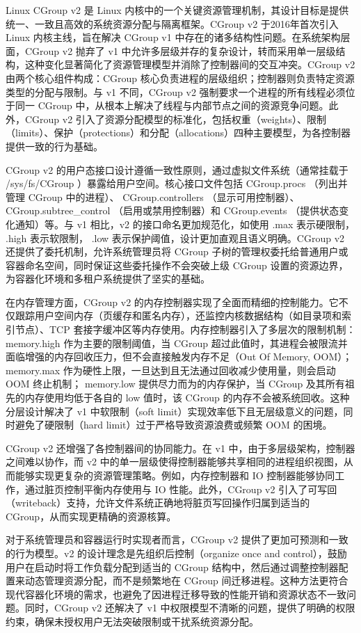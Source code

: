 Linux CGroup v2 是 Linux 内核中的一个关键资源管理机制，其设计目标是提供统一、一致且高效的系统资源分配与隔离框架。CGroup v2 于2016年首次引入 Linux 内核主线，旨在解决 CGroup v1 中存在的诸多结构性问题。在系统架构层面，CGroup v2 抛弃了 v1 中允许多层级并存的复杂设计，转而采用单一层级结构，这种变化显著简化了资源管理模型并消除了控制器间的交互冲突。CGroup v2 由两个核心组件构成：CGroup 核心负责进程的层级组织；控制器则负责特定资源类型的分配与限制。与 v1 不同，CGroup v2 强制要求一个进程的所有线程必须位于同一 CGroup 中，从根本上解决了线程与内部节点之间的资源竞争问题。此外，CGroup v2 引入了资源分配模型的标准化，包括权重（weights）、限制（limits）、保护（protections）和分配（allocations）四种主要模型，为各控制器提供一致的行为基础。

CGroup v2 的用户态接口设计遵循一致性原则，通过虚拟文件系统（通常挂载于 /sys/fs/CGroup ）暴露给用户空间。核心接口文件包括 CGroup.procs （列出并管理 CGroup 中的进程）、 CGroup.controllers （显示可用控制器）、 CGroup.subtree\_control （启用或禁用控制器）和 CGroup.events （提供状态变化通知）等。与 v1 相比，v2 的接口命名更加规范化，如使用 .max 表示硬限制， .high 表示软限制， .low 表示保护阈值，设计更加直观且语义明确。CGroup v2 还提供了委托机制，允许系统管理员将 CGroup 子树的管理权委托给普通用户或容器命名空间，同时保证这些委托操作不会突破上级 CGroup 设置的资源边界，为容器化环境和多租户系统提供了坚实的基础。

在内存管理方面，CGroup v2 的内存控制器实现了全面而精细的控制能力。它不仅跟踪用户空间内存（页缓存和匿名内存），还监控内核数据结构（如目录项和索引节点）、TCP 套接字缓冲区等内存使用。内存控制器引入了多层次的限制机制： memory.high 作为主要的限制阈值，当 CGroup 超过此值时，其进程会被限流并面临增强的内存回收压力，但不会直接触发内存不足（Out Of Memory, OOM）； memory.max 作为硬性上限，一旦达到且无法通过回收减少使用量，则会启动 OOM 终止机制； memory.low 提供尽力而为的内存保护，当 CGroup 及其所有祖先的内存使用均低于各自的 low 值时，该 CGroup 的内存不会被系统回收。这种分层设计解决了 v1 中软限制（soft limit）实现效率低下且无层级意义的问题，同时避免了硬限制（hard limit）过于严格导致资源浪费或频繁 OOM 的困境。

CGroup v2 还增强了各控制器间的协同能力。在 v1 中，由于多层级架构，控制器之间难以协作，而 v2 中的单一层级使得控制器能够共享相同的进程组织视图，从而能够实现更复杂的资源管理策略。例如，内存控制器和 IO 控制器能够协同工作，通过脏页控制平衡内存使用与 IO 性能。此外，CGroup v2 引入了可写回（writeback）支持，允许文件系统正确地将脏页写回操作归属到适当的 CGroup，从而实现更精确的资源核算。

对于系统管理员和容器运行时实现者而言，CGroup v2 提供了更加可预测和一致的行为模型。v2 的设计理念是先组织后控制（organize once and control），鼓励用户在启动时将工作负载分配到适当的 CGroup 结构中，然后通过调整控制器配置来动态管理资源分配，而不是频繁地在 CGroup 间迁移进程。这种方法更符合现代容器化环境的需求，也避免了因进程迁移导致的性能开销和资源状态不一致问题。同时，CGroup v2 还解决了 v1 中权限模型不清晰的问题，提供了明确的权限约束，确保未授权用户无法突破限制或干扰系统资源分配。

